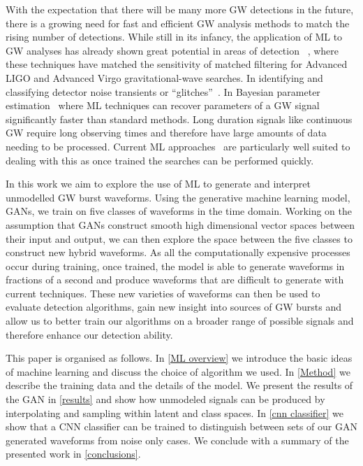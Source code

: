 \documentclass[12pt]{iopart}
\begin{document}
%
With the expectation that there will be many more \ac{GW} detections in the
future, there is a growing need for fast and efficient \ac{GW} analysis methods
to match the rising number of detections. While still in its infancy, the application of \ac{ML} to \ac{GW} analyses has already shown great potential in areas of detection ~\cite{Gabbard2017,Gebhard_2019,Krastev_2020}, where these techniques have matched the sensitivity of matched filtering for Advanced LIGO and Advanced Virgo gravitational-wave searches. In identifying and classifying detector noise transients or  ``glitches''~\cite{Bahaadini, George_2018,Razzano_2018, 2020arXiv200801262G}. In Bayesian parameter
estimation~\cite{gabbard2019bayesian,Chua:2019,green2020gravitationalwave} where \ac{ML} techniques can recover parameters of a \ac{GW} signal significantly faster than standard methods. Long duration signals like continuous \ac{GW} require long observing times and therefore have large amounts of data needing to be processed. Current \ac{ML} approaches~\cite{2020PhRvD.102b2005D, 2019PhRvD.100d4009D, 2020arXiv200708207B} are particularly well suited to dealing with this as once trained the searches can be performed quickly.

%
In this work we aim to explore the use of \ac{ML} to generate and interpret
unmodelled \ac{GW} burst waveforms. Using the generative machine learning
model, \acp{GAN}, we train on five classes of waveforms in the time domain. Working on the assumption that \acp{GAN} construct smooth
 high dimensional vector spaces between their input and output, we can then
explore the space between the five classes to construct new
hybrid waveforms. As all the computationally expensive
processes occur during training, once trained, the model is able to
generate waveforms in fractions of a second and produce waveforms that are difficult to generate with current
techniques. These new varieties of waveforms can then be used to evaluate
detection algorithms, gain new insight into sources of \ac{GW}
bursts and  allow us to better train our algorithms on a
broader range of possible signals and therefore enhance our detection ability. 

%
This paper is organised as follows. In \cref{ML overview} we introduce the basic ideas of machine learning and discuss the choice of algorithm we used. In \cref{Method} we describe the training data and the details of the model. We present the results of the GAN in \cref{results} and show how unmodeled signals can be produced by interpolating and sampling within latent and class spaces. In \cref{cnn classifier} we show that a \ac{CNN} classifier can be trained to distinguish between sets of our \ac{GAN} generated waveforms from noise only cases. We conclude with a summary of the presented work in \cref{conclusions}.
\end{document}
